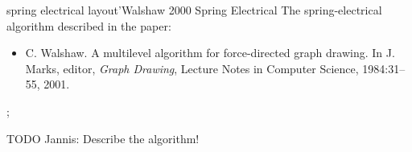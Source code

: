 \begin{gdalgorithm}{spring electrical layout'}{Walshaw 2000 Spring Electrical}
  The spring-electrical algorithm described in the paper:
  \begin{itemize}
  \item
    C. Walshaw.
    \newblock A multilevel algorithm for force-directed graph
    drawing.
    \newblock In J. Marks, editor, \emph{Graph Drawing}, Lecture Notes in
    Computer Science, 1984:31--55, 2001. 
  \end{itemize}
\begin{codeexample}[]
\tikz {};    
\end{codeexample}
  TODO Jannis: Describe the algorithm!
\end{gdalgorithm}


\endinput

